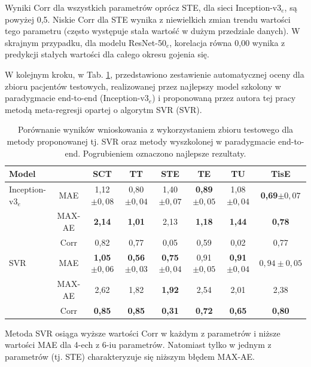 Wyniki Corr dla wszystkich parametrów oprócz STE, dla sieci Inception-v3$_{e}$, są powyżej 0,5. Niskie Corr dla STE wynika z niewielkich zmian trendu wartości tego parametru (często występuje stała wartość w dużym przedziale danych). W skrajnym przypadku, dla modelu ResNet-50$_{e}$, korelacja równa 0,00 wynika z predykcji stałych wartości dla całego okresu gojenia się.

W kolejnym kroku, w Tab. \ref{tab:end-to-end_testset}, przedstawiono zestawienie automatycznej oceny dla zbioru pacjentów testowych, realizowanej przez najlepszy model szkolony w paradygmacie end-to-end (Inception-v3$_e$) i proponowaną przez autora tej pracy metodą meta-regresji opartej o algorytm SVR (SVR).  
\renewcommand{\arraystretch}{1.2}
\begin{table}[t]
	\caption{Porównanie wyników wnioskowania z wykorzystaniem zbioru testowego dla metody proponowanej tj. SVR oraz metody wyszkolonej w paradygmacie end-to-end. Pogrubieniem oznaczono najlepsze rezultaty.}
	\scriptsize
	\begin{center}
		\begin{tabular}{lc||c|c|c|c|c|c}
			\textbf{Model} & & \textbf{SCT} & \textbf{TT} & \textbf{STE} & \textbf{TE} & \textbf{TU} & \textbf{TisE}\\ \hline \hline
			Inception-v3$_{e}$ & MAE & 1,12$\pm{0,08}$ & 0,80$\pm{0,04}$ & 1,40$\pm{0,07}$ & \textbf{0,89}$\pm{0,05}$ & 1,08$\pm{0,04}$ & \textbf{0,69}$\pm{0,07}$ \\
			& MAX-AE & \textbf{2,14} & \textbf{1,01} & 2,13 & \textbf{1,18} & \textbf{1,44} & \textbf{0,78} \\
			& Corr & 0,82 & 0,77 & 0,05 & 0,59 & 0,02 & 0,77 \\ \hline
			SVR & MAE & \textbf{1,05}$\pm0,06$ & \textbf{0,56}$\pm0,03$ & \textbf{0,75}$\pm0,04$ & 0,91$\pm0,05$ & \textbf{0,91}$\pm0,04$ & $0,94\pm0,05$\\
			& MAX-AE & 2,62 & 1,82 & \textbf{1,92} & 2,54 & 2,01 & 2,38 \\
			& Corr & \textbf{0,85} & \textbf{0,85} & \textbf{0,31} & \textbf{0,72} & \textbf{0,65} & \textbf{0,80} 
		\end{tabular}
	\end{center}
	\label{tab:end-to-end_testset}
\end{table}
\renewcommand{\arraystretch}{1}

Metoda SVR osiąga wyższe wartości Corr w każdym z parametrów i niższe wartości MAE dla 4-ech z 6-iu parametrów. Natomiast tylko w jednym z parametrów (tj. STE) charakteryzuje się niższym błędem MAX-AE. 

